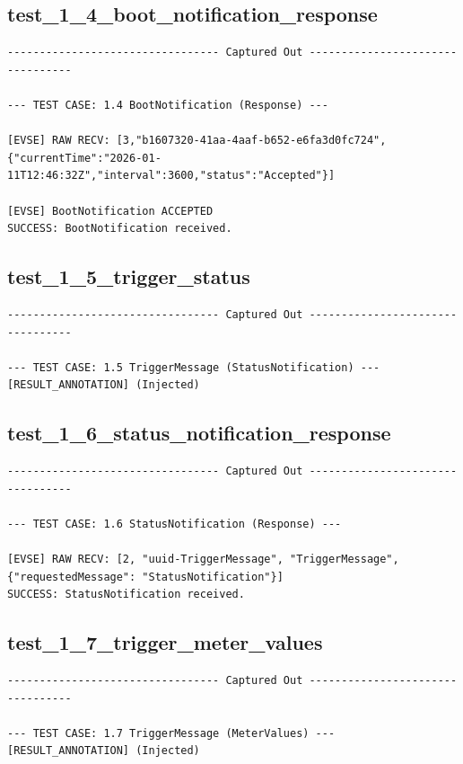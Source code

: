 \documentclass{article}
\begin{document}
\subsection*{test\_1\_4\_boot\_notification\_response}
\begin{lstlisting}
--------------------------------- Captured Out ---------------------------------

--- TEST CASE: 1.4 BootNotification (Response) ---

[EVSE] RAW RECV: [3,"b1607320-41aa-4aaf-b652-e6fa3d0fc724",{"currentTime":"2026-01-11T12:46:32Z","interval":3600,"status":"Accepted"}]

[EVSE] BootNotification ACCEPTED
SUCCESS: BootNotification received.
\end{lstlisting}
\subsection*{test\_1\_5\_trigger\_status}
\begin{lstlisting}
--------------------------------- Captured Out ---------------------------------

--- TEST CASE: 1.5 TriggerMessage (StatusNotification) ---
[RESULT_ANNOTATION] (Injected)
\end{lstlisting}
\subsection*{test\_1\_6\_status\_notification\_response}
\begin{lstlisting}
--------------------------------- Captured Out ---------------------------------

--- TEST CASE: 1.6 StatusNotification (Response) ---

[EVSE] RAW RECV: [2, "uuid-TriggerMessage", "TriggerMessage", {"requestedMessage": "StatusNotification"}]
SUCCESS: StatusNotification received.
\end{lstlisting}
\subsection*{test\_1\_7\_trigger\_meter\_values}
\begin{lstlisting}
--------------------------------- Captured Out ---------------------------------

--- TEST CASE: 1.7 TriggerMessage (MeterValues) ---
[RESULT_ANNOTATION] (Injected)
\end{lstlisting}
\end{document}
